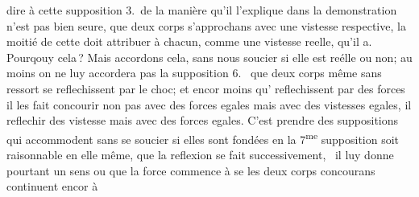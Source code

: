 %
dire à cette
%
%
supposition 3.\ de la manière qu'il l'explique dans la demonstration n'est pas bien seure, 
%
que deux corps s'approchans avec une vistesse respective,\protect{} la moitié de cette 
%
%
doit attribuer à chacun, comme une vistesse reelle,\protect{} qu'il a. Pourqouy cela\,\lbrack\!?\rbrack
\pend
%
\pstart
Mais accordons cela, 
%
sans nous soucier si elle est reélle ou non; au moins on ne luy accordera pas la supposition 6.\ 
%
que deux corps même sans ressort\protect{} se reflechissent par le choc;\protect{} et encor moins 
%
qu'
%
reflechissent 
%
par des forces
%
%
il les fait concourir non pas avec des forces egales\protect{} mais avec des vistesses egales,
%
%
il reflechir
%
%
des vistesse mais avec des forces egales. C'est prendre des suppositions qui accommodent sans se soucier si elles sont fondées en
%
%
la 7\textsuperscript{me} supposition soit raisonnable en elle même, que la reflexion\protect{} se fait successivement\lbrack,\rbrack\ 
%
il luy donne pourtant un sens ou
%
%
que la force\protect\index{Sachverzeichnis}{force} commence à se
%
%
les deux corps concourans continuent encor à
%
